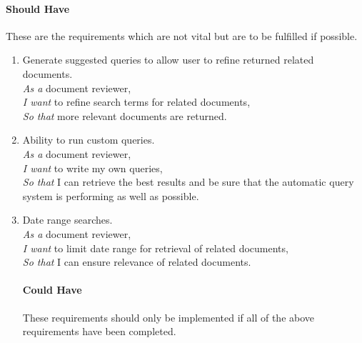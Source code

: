 \documentclass{l4proj}
\begin{document}
\paragraph{Should Have}
These are the requirements which are not vital but are to be fulfilled if possible.
\begin{enumerate}[label=\textbf{S.\arabic*}]
\paragraph{Should Have}
\item Generate suggested queries to allow user to refine returned related documents. \\
\textit{As a} document reviewer, \\
\textit{I want} to refine search terms for related documents, \\
\textit{So that} more relevant documents are returned.

\item Ability to run custom queries. \\
\textit{As a} document reviewer, \\
\textit{I want} to write my own queries, \\
\textit{So that} I can retrieve the best results and be sure that the automatic query system is performing as well as possible.

\item Date range searches. \\
\textit{As a} document reviewer, \\
\textit{I want} to limit date range for retrieval of related documents, \\
\textit{So that} I can ensure relevance of related documents.

\paragraph{Could Have}
These requirements should only be implemented if all of the above requirements have been completed.
\end{enumerate}
\end{document}
